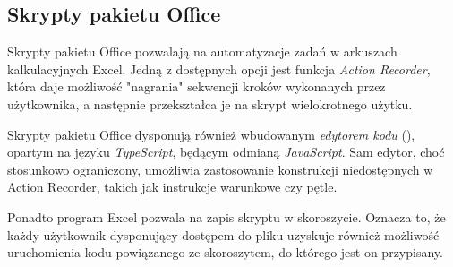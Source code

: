\subsection{Skrypty pakietu Office}
Skrypty pakietu Office pozwalają na automatyzacje zadań w arkuszach kalkulacyjnych Excel. Jedną z dostępnych opcji jest  funkcja \emph{Action Recorder}, która daje możliwość "nagrania" sekwencji kroków wykonanych przez użytkownika, a następnie przekształca je na skrypt wielokrotnego użytku.\par
Skrypty pakietu Office dysponują również wbudowanym \emph{edytorem kodu} (), opartym na języku \emph{TypeScript}, będącym odmianą \emph{JavaScript}. Sam edytor, choć stosunkowo ograniczony, umożliwia zastosowanie konstrukcji niedostępnych w Action Recorder, takich jak instrukcje warunkowe czy pętle.\par
Ponadto program Excel pozwala na zapis skryptu w skoroszycie. Oznacza to, że każdy użytkownik dysponujący dostępem do pliku uzyskuje również możliwość uruchomienia kodu powiązanego ze skoroszytem, do którego jest on przypisany.